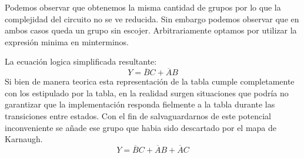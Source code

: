 Podemos observar que obtenemos la misma cantidad de grupos por lo que la complejidad del circuito no se ve reducida.
Sin embargo podemos observar que en ambos casos queda un grupo sin escojer.
Arbitrariamente optamos por utilizar la expresión minima en minterminos.
\begin{center}
 	\begin{Karnaughvuit}
    \end{Karnaughvuit}
\end{center}
La ecuación logica simplificada resultante:
	$$ 
		Y = \overline{B}C +  \overline{A}B
	$$
Si bien de manera teorica esta representación de la tabla cumple completamente con los estipulado por la tabla, en la realidad surgen situaciones que podría no garantizar que la implementación responda fielmente a la tabla durante las transiciones entre estados. 
Con el fin de salvaguardarnos de este potencial inconveniente se añade ese grupo que habia sido descartado por el mapa de Karnaugh.
	$$
		Y = \overline{B}C +  \overline{A}B + \overline{A}C
	$$
 
